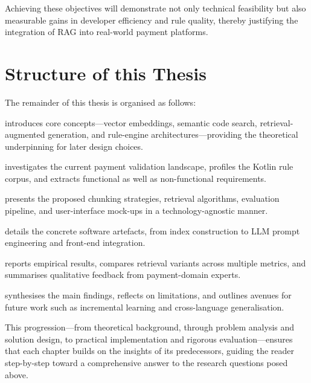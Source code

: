 Achieving these objectives will demonstrate not only technical feasibility but also measurable gains in developer efficiency and rule quality, thereby justifying the integration of RAG into real-world payment platforms.

\section{Structure of this Thesis}
\label{sec:structure}

The remainder of this thesis is organised as follows:

\begin{description}[leftmargin=1.6cm, style=nextline]
    \item[Chapter 2: Fundamentals] introduces core concepts—vector embeddings, semantic code search, retrieval-augmented generation, and rule-engine architectures—providing the theoretical underpinning for later design choices.
    \item[Chapter 3: Analysis] investigates the current payment validation landscape, profiles the Kotlin rule corpus, and extracts functional as well as non-functional requirements.
    \item[Chapter 4: Conceptual Design] presents the proposed chunking strategies, retrieval algorithms, evaluation pipeline, and user-interface mock-ups in a technology-agnostic manner.
    \item[Chapter 5: Implementation] details the concrete software artefacts, from index construction to LLM prompt engineering and front-end integration.
    \item[Chapter 6: Evaluation] reports empirical results, compares retrieval variants across multiple metrics, and summarises qualitative feedback from payment-domain experts.
    \item[Chapter 7: Conclusion and Outlook] synthesises the main findings, reflects on limitations, and outlines avenues for future work such as incremental learning and cross-language generalisation.
\end{description}

This progression—from theoretical background, through problem analysis and solution design, to practical implementation and rigorous evaluation—ensures that each chapter builds on the insights of its predecessors, guiding the reader step-by-step toward a comprehensive answer to the research questions posed above.
